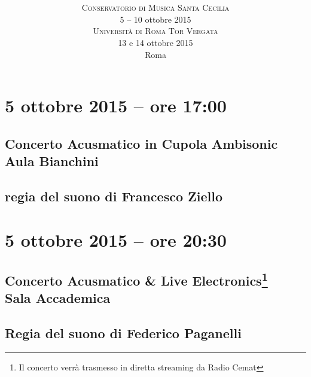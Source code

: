\documentclass[8pt, twoside, a5paper]{extreport}
\title{
	\svolk{CONSERVATORIO DI MUSICA S. CECILIA} \\
	\fontsize{50}{50}
	\svolk{
		\emph{
			EMUFest 2015
			}
		}
	} %
\author{
	\textsc{Conservatorio di Musica Santa Cecilia} \\
	5 -- 10 ottobre 2015 \\
	\textsc{Università di Roma Tor Vergata} \\
	13 e 14 ottobre 2015 \\
	Roma
}
\date{}
\begin{document}
\pagestyle{empty}
\maketitle 



\section*{5 ottobre 2015 -- ore 17:00}

\subsection*{{\small Concerto Acusmatico in Cupola Ambisonic} \\
	\textsf{Aula Bianchini}}

{\fontsize{30}{30} }

\subsection*{\textsf{regia del suono di Francesco Ziello}}

\bigskip

\begin{multicols}{2}




\end{multicols}

\clearpage

\section*{5 ottobre 2015 -- ore 20:30}

\subsection*{{\small Concerto Acusmatico \& Live Electronics\footnote{ Il concerto verrà trasmesso in diretta streaming da Radio Cemat}} \\
	\textsf{Sala Accademica}}

{\fontsize{30}{30} }

\subsection*{\textsf{Regia del suono di Federico Paganelli}}
\end{document}
